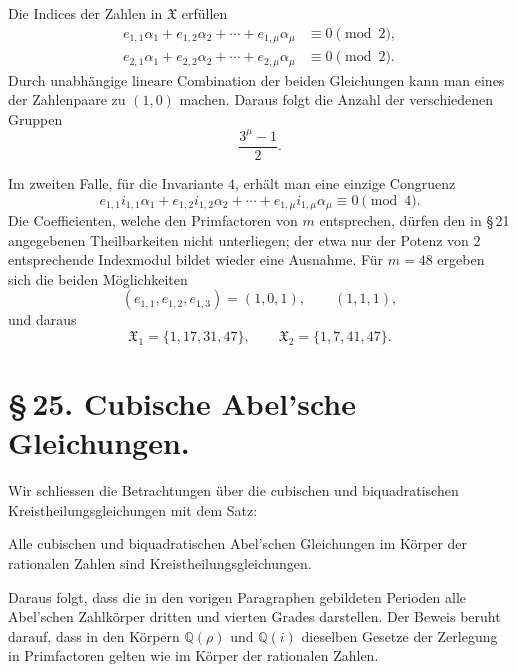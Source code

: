 \documentclass[11pt]{article}
\providecommand{\grpX}{\mathfrak X}
\begin{document}
Die Indices der Zahlen in $\grpX$ erfüllen
\begin{equation}
\begin{aligned}
 e_{1,1}\alpha_1+e_{1,2}\alpha_2+
    \cdots+e_{1,\mu}\alpha_\mu&\equiv0\pmod2,\\
 e_{2,1}\alpha_1+e_{2,2}\alpha_2+
    \cdots+e_{2,\mu}\alpha_\mu&\equiv0\pmod2.
\end{aligned}
\tag{3}
\end{equation}
Durch unabhängige lineare Combination der beiden Gleichungen kann man eines der Zahlenpaare zu $(1,0)$ machen. Daraus folgt die Anzahl der verschiedenen Gruppen
\begin{equation}
   \frac{3^\mu-1}{2}.
   \tag{4}
\end{equation}

Im zweiten Falle, für die Invariante $4$, erhält man eine einzige Congruenz
\begin{equation}
   e_{1,1}i_{1,1}\alpha_1+e_{1,2}i_{1,2}\alpha_2+
   \cdots+e_{1,\mu}i_{1,\mu}\alpha_\mu\equiv0\pmod4.
   \tag{5}
\end{equation}
Die Coefficienten, welche den Primfactoren von $m$ entsprechen, dürfen den in \S\,21 angegebenen Theilbarkeiten nicht unterliegen; der etwa nur der Potenz von $2$ entsprechende Indexmodul bildet wieder eine Ausnahme. Für $m=48$ ergeben sich die beiden Möglichkeiten
\[
   (e_{1,1},e_{1,2},e_{1,3})=(1,0,1),
   \qquad (1,1,1),
\]
und daraus
\begin{equation}
   \grpX_1=\{1,17,31,47\},
   \qquad
   \grpX_2=\{1,7,41,47\}.
   \tag{6}
\end{equation}

\section*{\S\,25. Cubische Abel'sche Gleichungen.}

Wir schliessen die Betrachtungen über die cubischen und biquadratischen Kreistheilungsgleichungen mit dem Satz:

\medskip
\noindent Alle cubischen und biquadratischen Abel'schen Gleichungen im Körper der rationalen Zahlen sind Kreistheilungsgleichungen.

\medskip
Daraus folgt, dass die in den vorigen Paragraphen gebildeten Perioden alle Abel'schen Zahlkörper dritten und vierten Grades darstellen. Der Beweis beruht darauf, dass in den Körpern $\mathbb Q(\rho)$ und $\mathbb Q(i)$ dieselben Gesetze der Zerlegung in Primfactoren gelten wie im Körper der rationalen Zahlen.
\end{document}
